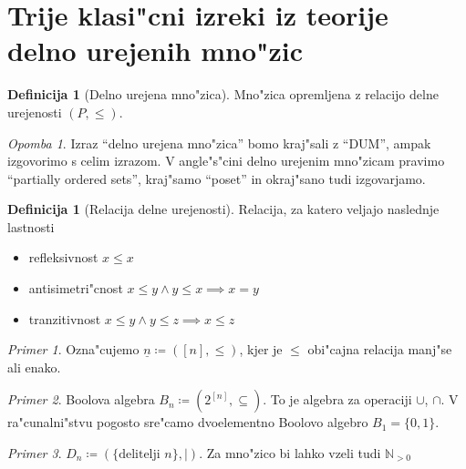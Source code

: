\documentclass[a4paper,12pt]{article}
\theoremstyle{definition}
\newtheorem{defn}[counter]{Definicija}
\theoremstyle{remark}
\newtheorem*{ex}{Primer}
\newtheorem*{rem}{Opomba}
\newcommand{\N}{\mathbb{N}}
\begin{document}
\label{TODO: dopolni?}
	

\section{Trije klasi"cni izreki iz teorije delno urejenih mno"zic}
\begin{defn}[Delno urejena mno"zica]
	Mno"zica opremljena z relacijo delne urejenosti $(P, \leqslant)$.
\end{defn}
\begin{rem}
	Izraz ``delno urejena mno"zica'' bomo kraj"sali z ``DUM'', ampak izgovorimo s celim izrazom. V angle"s"cini delno urejenim mno"zicam pravimo ``partially ordered sets'', kraj"samo ``poset'' in okraj"sano tudi izgovarjamo.
\end{rem}
\begin{defn}[Relacija delne urejenosti]
	Relacija, za katero veljajo naslednje lastnosti
	\begin{itemize}
		\item refleksivnost $x \leqslant x$
		\item antisimetri"cnost $x \leqslant y \land y \leqslant x \implies x = y$
		\item tranzitivnost $x \leqslant y \land y \leqslant z \implies x \leqslant z$
	\end{itemize}
\end{defn}
\begin{ex}
	Ozna"cujemo $\underline{n} \coloneqq ([n], \leqslant)$, kjer je $\leqslant$ obi"cajna relacija manj"se ali enako.
\end{ex}
\begin{ex}
	Boolova algebra $B_n \coloneqq (2^{[n]}, \subseteq)$. To je algebra za operaciji $\cup$, $\cap$. V ra"cunalni"stvu pogosto sre"camo dvoelementno Boolovo algebro $B_1 = \{0, 1\}$.
\end{ex}
\begin{ex}
	$D_n \coloneqq (\{\text{delitelji }n\}, |)$. Za mno"zico bi lahko vzeli tudi $\N_{>0}$
\end{ex}
\end{document}
